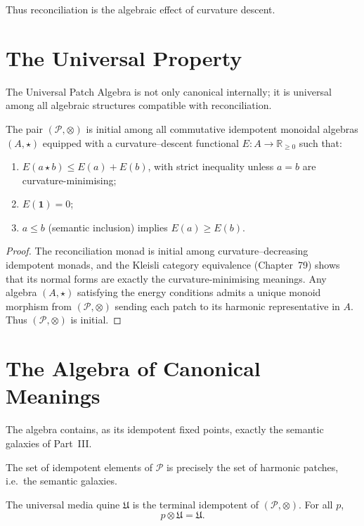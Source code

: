 Thus reconciliation is the algebraic effect of curvature descent.

\section{The Universal Property}
\label{sec:80-4}

The Universal Patch Algebra is not only canonical internally; it is
universal among all algebraic structures compatible with reconciliation.

\begin{theorem}
\label{thm:80-universal}
The pair $(\mathcal{P},\otimes)$ is initial among all commutative
idempotent monoidal algebras $(A,\star)$ equipped with a curvature–descent
functional $E:A\to\mathbb{R}_{\ge 0}$ such that:
\begin{enumerate}
\item $E(a\star b)\le E(a)+E(b)$, with strict inequality unless $a=b$ are
      curvature-minimising;
\item $E(\mathbf{1})=0$;
\item $a\le b$ (semantic inclusion) implies $E(a)\ge E(b)$.
\end{enumerate}
\end{theorem}

\begin{proof}
The reconciliation monad is initial among curvature–decreasing idempotent
monads, and the Kleisli category equivalence (Chapter~79) shows that its
normal forms are exactly the curvature-minimising meanings.  
Any algebra $(A,\star)$ satisfying the energy conditions admits a unique
monoid morphism from $(\mathcal{P},\otimes)$ sending each patch to its
harmonic representative in $A$.  
Thus $(\mathcal{P},\otimes)$ is initial.
\end{proof}

\section{The Algebra of Canonical Meanings}
\label{sec:80-5}

The algebra contains, as its idempotent fixed points, exactly the
semantic galaxies of Part~III.

\begin{corollary}
The set of idempotent elements of $\mathcal{P}$ is precisely the set of
harmonic patches, i.e.\ the semantic galaxies.
\end{corollary}

\begin{corollary}
The universal media quine $\mathfrak{U}$ is the terminal idempotent of
$(\mathcal{P},\otimes)$.  
For all $p$,
\[
p\otimes\mathfrak{U} = \mathfrak{U}.
\]
\end{corollary}

